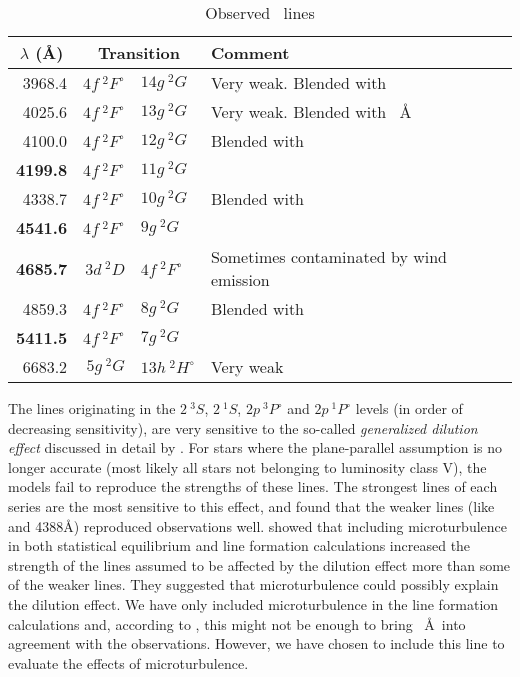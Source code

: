 \begin{table} %
\begin{center}
\caption{Observed \heii\ lines}
\begin{tabular}{rr@{ -- }lp{10cm}}
\hline\hline
\multicolumn{1}{c}{$\lambda$ (\AA)} & \multicolumn{2}{c}{Transition} &
Comment \\ 
\hline
3968.4 		& $4f~^2F^\circ$ & $14g~^2G$	& Very weak. Blended with \hi \\
4025.6 		& $4f~^2F^\circ$ & $13g~^2G$	& Very weak. Blended
						with \hei~\lam4026\AA \\
4100.0 		& $4f~^2F^\circ$ & $12g~^2G$	& Blended with \hi\\
\textbf{4199.8}	& $4f~^2F^\circ$ & $11g~^2G$	& \\
4338.7 		& $4f~^2F^\circ$ & $10g~^2G$	& Blended with \hi\\
\textbf{4541.6} & $4f~^2F^\circ$ & $9g~^2G$	& \\
\textbf{4685.7} & $3d~^2D$ & $4f~^2F^\circ$	& Sometimes contaminated by wind emission\\
4859.3 		& $4f~^2F^\circ$ & $8g~^2G$	& Blended with \hi\\
\textbf{5411.5}	& $4f~^2F^\circ$ & $7g~^2G$	& \\
6683.2 		& $5g~^2G$ & $13h~^2H^\circ$	& Very weak\\
\hline\hline
\end{tabular}
\label{ta:he2_lines}
\end{center}
\end{table} %

The lines originating in the $2~^3S$, $2~^1S$, $2p~^3P^\circ$ and
$2p~^1P^\circ$ levels (in order of decreasing sensitivity), are very
sensitive to the so-called \emph{generalized dilution effect}
discussed in detail by . For stars where the
plane-parallel assumption is no longer accurate (most likely all stars
not belonging to luminosity class V), the models fail to reproduce the
strengths of these lines. The strongest lines of each series are the
most sensitive to this effect, and  found that the weaker
lines (like \lam{} and 4388\AA) reproduced observations
well.  showed that including microturbulence in both
statistical equilibrium and line formation calculations increased the
strength of the lines assumed to be affected by the dilution effect
more than some of the weaker lines. They suggested that
microturbulence could possibly explain the dilution effect. We have
only included microturbulence in the line formation calculations and,
according to , this might not be enough to bring
\hei~\AA\ into agreement with the observations.  However, we
have chosen to include this line to evaluate the effects of
microturbulence.

